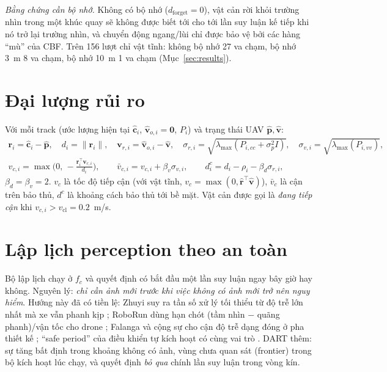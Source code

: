 \documentclass[11pt,a4paper]{article}
\numberwithin{equation}{section}
\newcommand{\vb}[1]{\bm{#1}}
\newcommand{\T}{^{\!\top}}
\newcommand{\lmax}{\lambda_{\max}}
\theoremstyle{definition}
\theoremstyle{plain}
\theoremstyle{remark}
\begin{document}
\emph{Bằng chứng cần bộ nhớ.} Không có bộ nhớ ($d_{\text{forget}}=0$), vật cản rời khỏi trường nhìn trong một khúc quay sẽ không được biết tới cho tới lần suy luận kế tiếp khi nó trở lại trường nhìn, và chuyển động ngang/lùi chỉ được bảo vệ bởi các hàng ``mù'' của CBF. Trên 156 lượt chỉ vật tĩnh: không bộ nhớ 27 va chạm, bộ nhớ 3~m 8 va chạm, bộ nhớ 10~m 1 va chạm (Mục~\ref{sec:results}).

\section{Đại lượng rủi ro}
\label{sec:risk}
Với mỗi track (ước lượng hiện tại $\hat{\vb c}_i$, $\hat{\vb v}_{o,i}=\vb 0$, $P_i$) và trạng thái UAV $\hat{\vb p},\hat{\vb v}$:
\begin{gather}
\vb r_i=\hat{\vb c}_i-\hat{\vb p},\quad d_i=\|\vb r_i\|,\quad \vb v_{r,i}=\hat{\vb v}_{o,i}-\hat{\vb v},\quad
\sigma_{r,i}=\sqrt{\lmax(P_{i,cc}+\sigma_p^2I)},\quad \sigma_{v,i}=\sqrt{\lmax(P_{i,vv})}, \label{eq:sig}\\
v_{c,i}=\max\!\Big(0,\,-\frac{\vb r_i\T\vb v_{r,i}}{d_i}\Big),\qquad
\bar v_{c,i}=v_{c,i}+\beta_v\sigma_{v,i},\qquad
d^c_i=d_i-\rho_i-\beta_d\sigma_{r,i}, \label{eq:vc}
\end{gather}
$\beta_d=\beta_v=2$. $v_c$ là tốc độ tiếp cận (với vật tĩnh, $v_c=\max(0,\hat{\vb r}\T\hat{\vb v})$), $\bar v_c$ là cận trên bảo thủ, $d^c$ là khoảng cách bảo thủ tới bề mặt. Vật cản được gọi là \emph{đang tiếp cận} khi $v_{c,i}>v_{\text{cl}}=0.2$~m/s.

\section{Lập lịch perception theo an toàn}
\label{sec:sched}
Bộ lập lịch chạy ở $f_c$ và quyết định có bắt đầu một lần suy luận ngay bây giờ hay không. Nguyên lý: \emph{chỉ cần ảnh mới trước khi việc không có ảnh mới trở nên nguy hiểm}. Hướng này đã có tiền lệ: Zhuyi suy ra tần số xử lý tối thiểu từ độ trễ lớn nhất mà xe vẫn phanh kịp \cite{hsiao2022zhuyi}; RoboRun dùng hạn chót (tầm nhìn $-$ quãng phanh)/vận tốc cho drone \cite{boroujerdian2021roborun}; Falanga và cộng sự cho cận độ trễ dạng đóng ở pha thiết kế \cite{falanga2019fast}; ``safe period'' của điều khiển tự kích hoạt có cùng vai trò \cite{yang2019selftrig}. DART thêm: sự tăng bất định trong khoảng không có ảnh, vùng chưa quan sát (frontier) trong bộ kích hoạt lúc chạy, và quyết định \emph{bỏ qua} chính lần suy luận trong vòng kín.
\end{document}
